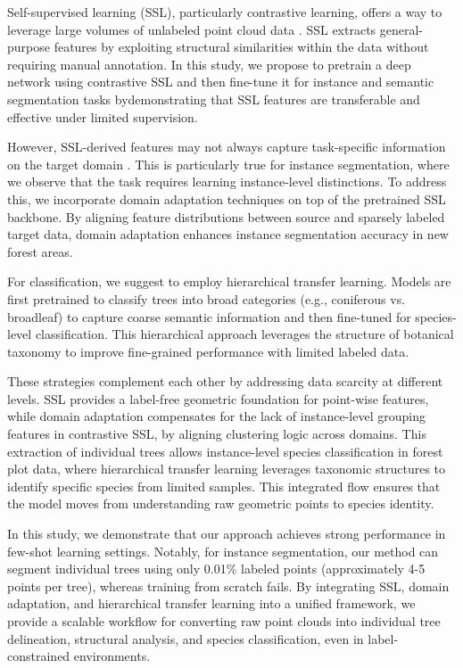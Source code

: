 \documentclass[review,authoryear]{elsarticle}
\begin{document}
Self-supervised learning (SSL), particularly contrastive learning, offers a way to leverage large volumes of unlabeled point cloud data \citep{xie2020pointcontrast,hou2021contrastive,wu2023masked}. SSL extracts general-purpose features by exploiting structural similarities within the data without requiring manual annotation. In this study, we propose to pretrain a deep network using contrastive SSL and then fine-tune it for instance and semantic segmentation tasks bydemonstrating that SSL features are transferable and effective under limited supervision.

However, SSL-derived features may not always capture task-specific information on the target domain \citep{saito2020universal}. This is particularly true for instance segmentation, where we observe that the task requires learning instance-level distinctions. To address this, we incorporate domain adaptation techniques on top of the pretrained SSL backbone. By aligning feature distributions between source and sparsely labeled target data, domain adaptation enhances instance segmentation accuracy in new forest areas.

For classification, we suggest to employ hierarchical transfer learning. Models are first pretrained to classify trees into broad categories (e.g., coniferous vs. broadleaf) to capture coarse semantic information and then fine-tuned for species-level classification. This hierarchical approach leverages the structure of botanical taxonomy to improve fine-grained performance with limited labeled data.

These strategies complement each other by addressing data scarcity at different levels. SSL provides a label-free geometric foundation for point-wise features, while domain adaptation compensates for the lack of instance-level grouping features in contrastive SSL, by aligning clustering logic across domains. This extraction of individual trees allows instance-level species classification in forest plot data, where hierarchical transfer learning leverages taxonomic structures to identify specific species from limited samples. This integrated flow ensures that the model moves from understanding raw geometric points to species identity.

In this study, we demonstrate that our approach achieves strong performance in few-shot learning settings. Notably, for instance segmentation, our method can segment individual trees using only 0.01\% labeled points (approximately 4-5 points per tree), whereas training from scratch fails. By integrating SSL, domain adaptation, and hierarchical transfer learning into a unified framework, we provide a scalable workflow for converting raw point clouds into individual tree delineation, structural analysis, and species classification, even in label-constrained environments. 
\end{document}
